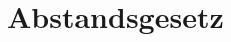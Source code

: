 \documentclass[../protokoll.tex]{subfiles}
\begin{document}
\section{Abstandsgesetz}\label{sec:Abstandsgesetz}
\end{document}
